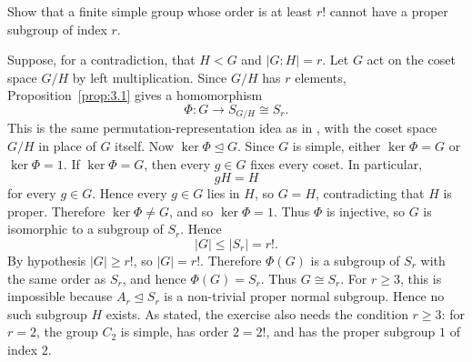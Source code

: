 \documentclass[../Odyssey_Project.tex]{subfiles}
\begin{document}
\begin{exercise}
\label{ex:3.1}
Show that a finite simple group whose order is at least $r!$ cannot have a proper subgroup of index $r$.
\end{exercise}
\begin{solution}
    Suppose, for a contradiction, that $H < G$ and $|G:H| = r$.
    Let $G$ act on the coset space $G/H$ by left multiplication. Since $G/H$ has $r$ elements, Proposition~\ref{prop:3.1} gives a homomorphism
    \[
        \Phi \colon G \to S_{G/H} \cong S_r.
    \]
    This is the same permutation-representation idea as in , with the coset space $G/H$ in place of $G$ itself.
    Now $\ker\Phi \trianglelefteq G$. Since $G$ is simple, either $\ker\Phi = G$ or $\ker\Phi = 1$.
    If $\ker\Phi = G$, then every $g \in G$ fixes every coset. In particular,
    \[
        gH = H
    \]
    for every $g \in G$. Hence every $g \in G$ lies in $H$, so $G = H$, contradicting that $H$ is proper. Therefore $\ker\Phi \neq G$, and so $\ker\Phi = 1$.
    Thus $\Phi$ is injective, so $G$ is isomorphic to a subgroup of $S_r$. Hence
    \[
        |G| \leq |S_r| = r!.
    \]
    By hypothesis $|G| \geq r!$, so $|G| = r!$. Therefore $\Phi(G)$ is a subgroup of $S_r$ with the same order as $S_r$, and hence $\Phi(G) = S_r$. Thus $G \cong S_r$.
    For $r \geq 3$, this is impossible because $A_r \trianglelefteq S_r$ is a non-trivial proper normal subgroup. Hence no such subgroup $H$ exists.
    As stated, the exercise also needs the condition $r \geq 3$: for $r = 2$, the group $C_2$ is simple, has order $2 = 2!$, and has the proper subgroup $1$ of index $2$.
\end{solution}
\end{document}
